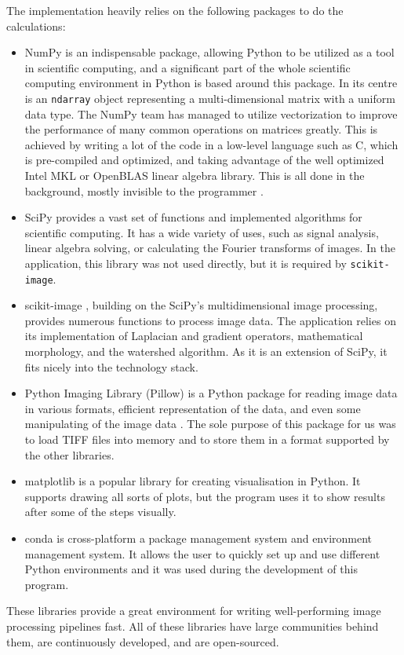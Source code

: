 \documentclass[
  digital,     %
  oneside,     %
  nosansbold,  %
  nocolorbold, %
  lof,         %
  lot,         %
]{fithesis4}
\begin{document}
The implementation heavily relies on the following packages to do the calculations:
\begin{itemize}
    \item{NumPy \cite{harris2020array} is an indispensable package, allowing
        Python to be utilized as a tool in scientific computing, and a
        significant part of the whole scientific computing environment in Python
        is based around this package. In its centre is an \texttt{ndarray} object
        representing a multi-dimensional matrix with a uniform data type. The
        NumPy team has managed to utilize vectorization to improve the
        performance of many common operations on matrices greatly. This is achieved by
        writing a lot of the code in a low-level language such as C, which is
        pre-compiled and optimized, and taking advantage of the well optimized
        Intel MKL or OpenBLAS linear algebra library. This is all done in the
        background, mostly invisible to the programmer \cite{numpyManual2022}.}
    \item{SciPy \cite{2020SciPy-NMeth} provides a vast set of functions and
        implemented algorithms for scientific computing. It has a wide variety of
        uses, such as signal analysis, linear algebra solving, or calculating the
        Fourier transforms of images. In the application, this library was not used
        directly, but it is required by \texttt{scikit-image}.}
    \item{scikit-image \cite{scikit-image}, building on the SciPy's
        multidimensional image processing, provides numerous functions to
        process image data. The application relies on its implementation of
        Laplacian and gradient operators, mathematical morphology, and the watershed
        algorithm. As it is an extension of SciPy, it fits nicely into the
        technology stack.}
    \item{Python Imaging Library (Pillow) is a Python package for reading image
        data in various formats, efficient representation of the data, and even
        some manipulating of the image data \cite{clarkc20102023}. The sole
        purpose of this package for us was to load TIFF files into memory
        and to store them in a format supported by the other libraries.}
    \item{matplotlib \cite{hunter2007} is a popular library for creating
        visualisation in Python. It supports drawing all sorts of plots, but the
        program uses it to show results after some of the steps visually.}
    \item{conda is cross-platform a package management system and environment
        management system. It allows the user to quickly set up and use different
        Python environments and it was used during the development of this program.
        \cite{conda-manual}}
\end{itemize}
These libraries provide a great environment for writing well-performing image
processing pipelines fast. All of these libraries have large communities
behind them, are continuously developed, and are open-sourced.
\end{document}
